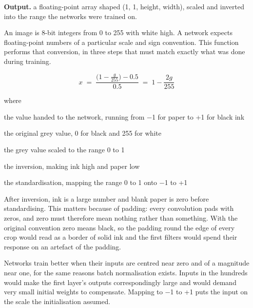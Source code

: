 \noindent\textbf{Output.} a floating-point array shaped (1, 1, height, width), scaled and inverted into the range the networks were trained on.


An image is 8-bit integers from 0 to 255 with white high. A network expects floating-point numbers of a particular scale and sign convention. This function performs that conversion, in three steps that must match exactly what was done during training.


\begin{equation}
x \;=\; \frac{\big(1 - \frac{g}{255}\big) - 0.5}{0.5} \;=\; 1 - \frac{2g}{255}
\end{equation}

\noindent where
\begin{description}[leftmargin=2.4em,style=nextline,font=\normalfont\ttfamily]\setlength\itemsep{1pt}
  \item[{$x$}] \normalfont the value handed to the network, running from $-$1 for paper to +1 for black ink
  \item[{$g$}] \normalfont the original grey value, 0 for black and 255 for white
  \item[{$\frac{g}{255}$}] \normalfont the grey value scaled to the range 0 to 1
  \item[{$1 - \cdot$}] \normalfont the inversion, making ink high and paper low
  \item[{$\frac{\cdot - 0.5}{0.5}$}] \normalfont the standardisation, mapping the range 0 to 1 onto $-$1 to +1
\end{description}

After inversion, ink is a large number and blank paper is zero before standardising. This matters because of padding: every convolution pads with zeros, and zero must therefore mean nothing rather than something. With the original convention zero means black, so the padding round the edge of every crop would read as a border of solid ink and the first filters would spend their response on an artefact of the padding.


Networks train better when their inputs are centred near zero and of a magnitude near one, for the same reasons batch normalisation exists. Inputs in the hundreds would make the first layer's outputs correspondingly large and would demand very small initial weights to compensate. Mapping to $-$1 to +1 puts the input on the scale the initialisation assumed.


